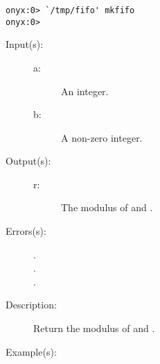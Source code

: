 \begin{description}
\begin{description}
\begin{verbatim}
onyx:0> `/tmp/fifo' mkfifo
onyx:0>
		\end{verbatim}
	\end{description}
\label{systemdict:mod}
\item[{\onyxop{a b}{mod}{r}}: ]
	\begin{description}\item[]
	\item[Input(s): ]
		\begin{description}\item[]
		\item[a: ]
			An integer.
		\item[b: ]
			A non-zero integer.
		\end{description}
	\item[Output(s): ]
		\begin{description}\item[]
		\item[r: ]
			The modulus of  and .
		\end{description}
	\item[Errors(s): ]
		\begin{description}\item[]
		\item[.]
		\item[.]
		\item[.]
		\end{description}
	\item[Description: ]
			Return the modulus of  and .
	\item[Example(s): ]\begin{verbatim}


\end{verbatim}
\end{description}
\end{description}
